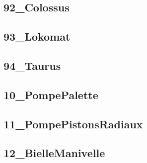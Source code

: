 \subsection{92\_Colossus}
\graphicspath{{../11-Actions Mécaniques/TD/TEC/Meq-Jeq/92_Colossus/images/}{../11-Actions Mécaniques/TD/TEC/Meq-Jeq/92_Colossus/}{../Style/png/}}


\subsection{93\_Lokomat}
\graphicspath{{../11-Actions Mécaniques/TD/TEC/Meq-Jeq/93_Lokomat/images/}{../11-Actions Mécaniques/TD/TEC/Meq-Jeq/93_Lokomat/}{../Style/png/}}


\subsection{94\_Taurus}
\graphicspath{{../11-Actions Mécaniques/TD/TEC/Meq-Jeq/94_Taurus/images/}{../11-Actions Mécaniques/TD/TEC/Meq-Jeq/94_Taurus/}{../Style/png/}}


\subsection{10\_PompePalette}
\graphicspath{{../11-Actions Mécaniques/TD/TEC/TEC-05/10_PompePalette/images/}{../11-Actions Mécaniques/TD/TEC/TEC-05/10_PompePalette/}{../Style/png/}}


\subsection{11\_PompePistonsRadiaux}
\graphicspath{{../11-Actions Mécaniques/TD/TEC/TEC-05/11_PompePistonsRadiaux/images/}{../11-Actions Mécaniques/TD/TEC/TEC-05/11_PompePistonsRadiaux/}{../Style/png/}}


\subsection{12\_BielleManivelle}
\graphicspath{{../11-Actions Mécaniques/TD/TEC/TEC-05/12_BielleManivelle/images/}{../11-Actions Mécaniques/TD/TEC/TEC-05/12_BielleManivelle/}{../Style/png/}}


